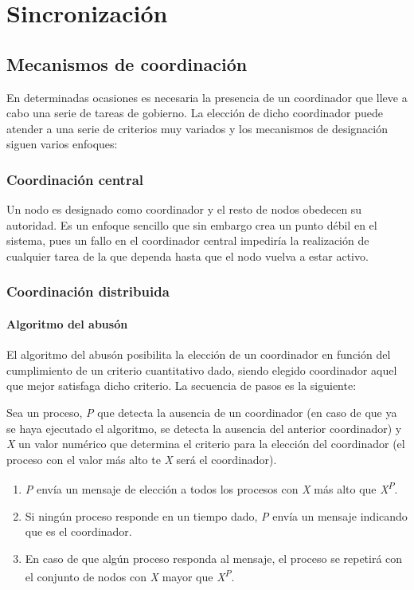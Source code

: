 \section{Sincronización}

\subsection{Mecanismos de coordinación}

En determinadas ocasiones es necesaria la presencia de un coordinador que lleve a cabo una serie de tareas de gobierno. La elección de dicho coordinador puede atender a una serie de criterios muy variados y los mecanismos de designación siguen varios enfoques:

\subsubsection{Coordinación central}

Un nodo es designado como coordinador y el resto de nodos obedecen su autoridad. Es un enfoque sencillo que sin embargo crea un punto débil en el sistema, pues un fallo en el coordinador central impediría la realización de cualquier tarea de la que dependa hasta que el nodo vuelva a estar activo.

\subsubsection{Coordinación distribuida}

\paragraph{Algoritmo del abusón}

El algoritmo del abusón posibilita la elección de un coordinador en función del cumplimiento de un criterio cuantitativo dado, siendo elegido coordinador aquel que mejor satisfaga dicho criterio. La secuencia de pasos es la siguiente:

Sea un proceso, \textit{P} que detecta la ausencia de un coordinador (en caso de que ya se haya ejecutado el algoritmo, se detecta la ausencia del anterior coordinador) y \textit{X} un valor numérico que determina el criterio para la elección del coordinador (el proceso con el valor más alto te \textit{X} será el coordinador).
\begin{enumerate}
\item \textit{P} envía un mensaje de elección a todos los procesos con \textit{X} más alto que \textit{X\textsuperscript{P}}.
\item Si ningún proceso responde en un tiempo dado, \textit{P} envía un mensaje indicando que es el coordinador.
\item En caso de que algún proceso responda al mensaje, el proceso se repetirá con el conjunto de nodos con \textit{X} mayor que \textit{X\textsuperscript{P}}.
\end{enumerate}

